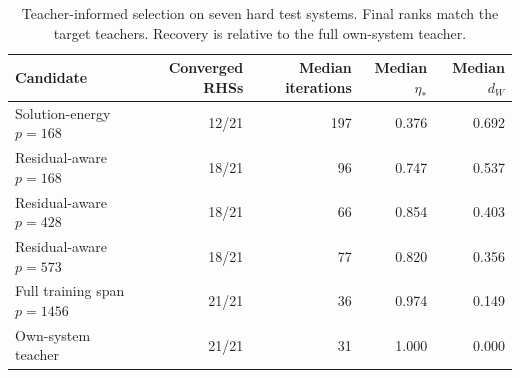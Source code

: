 \begin{table}[htbp]
\centering
\caption{Teacher-informed selection on seven hard test systems. Final ranks match the target teachers. Recovery is relative to the full own-system teacher.}
\label{tab:dictionary-ceilings}
\small
\begin{tabular}{lrrrr}
\toprule
Candidate & Converged RHSs & Median iterations & Median $\eta_*$ & Median $d_W$\\
\midrule
Solution-energy $p=168$ & 12/21 & 197 & 0.376 & 0.692\\
Residual-aware $p=168$ & 18/21 & 96 & 0.747 & 0.537\\
Residual-aware $p=428$ & 18/21 & 66 & 0.854 & 0.403\\
Residual-aware $p=573$ & 18/21 & 77 & 0.820 & 0.356\\
Full training span $p=1456$ & 21/21 & 36 & 0.974 & 0.149\\
Own-system teacher & 21/21 & 31 & 1.000 & 0.000\\
\bottomrule
\end{tabular}
\end{table}
